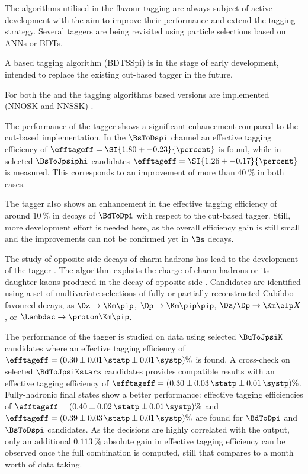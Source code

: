 The algorithms utilised in the flavour tagging are always subject of active
development with the aim to improve their performance and extend the tagging
strategy. Several taggers are being revisited using particle selections based on
\acp{ANN} or \acp{BDT}.

A \BDT based \SSpi tagging algorithm (\acs{BDTSSpi}) is in the stage of early
development, intended to replace the existing cut-based \SSpi tagger in the
future.

For both the \OSK and the \SSK tagging algorithms \ANN based versions are
implemented (\acs{NNOSK} and \acs{NNSSK}) \cite{FT:KaonNNet}. 

The performance of the \NNSSK tagger shows a significant enhancement compared to
the cut-based \SSK implementation. In the $\BsToDspi$ channel an effective
tagging efficiency of $\efftageff = \SI{1.80 +- 0.23}{\percent}$ is found, while
in selected $\BsToJpsiphi$ candidates $\efftageff = \SI{1.26 +- 0.17}{\percent}$
is measured. This corresponds to an improvement of more than $\SI{40}{\percent}$
in both cases.

The \NNOSK tagger also shows an enhancement in the effective tagging efficiency
of around $\SI{10}{\percent}$ in decays of $\BdToDpi$ with respect to the
cut-based \OSK tagger. Still, more development effort is needed here, as the
overall efficiency gain is still small and the improvements can not be confirmed
yet in $\Bs$ decays.

The study of opposite side decays of charm hadrons has lead to the development
of the \OSc tagger \cite{FT:OSCharm}. The \OSc algorithm exploits the charge of
charm hadrons or its daughter kaons produced in the decay of opposite side
\bhadrons. Candidates are identified using a set of multivariate selections of
fully or partially reconstructed Cabibbo-favoured decays, as \eg
$\Dz\to\Km\pip$, $\Dp\to\Km\pip\pip$, $\Dz/\Dp\to\Km\elp X$, or
$\Lambdac\to\proton\Km\pip$. 

The performance of the \OSc tagger is studied on data using selected
$\BuToJpsiK$ candidates where an effective tagging efficiency of $\efftageff =
(0.30 \pm 0.01\,\statp \pm 0.01\,\systp)\%$ is found. A cross-check on selected
$\BdToJpsiKstarz$ candidates provides compatible results with an effective
tagging efficiency of $\efftageff = (0.30 \pm 0.03\,\statp \pm 0.01\,\systp)\%$.
Fully-hadronic final states show a better performance: effective tagging
efficiencies of $\efftageff = (0.40 \pm 0.02\,\statp \pm 0.01\,\systp)\%$ and
$\efftageff = (0.39 \pm 0.03\,\statp \pm 0.01\,\systp)\%$ are found for
$\BdToDpi$ and $\BsToDspi$ candidates. As the \OSc decisions are highly
correlated with the \OSK output, only an additional $\SI{0.113}{\percent}$
absolute gain in effective tagging efficiency can be observed once the full \OS
combination is computed, still that compares to a month worth of \RunOne data
taking.

